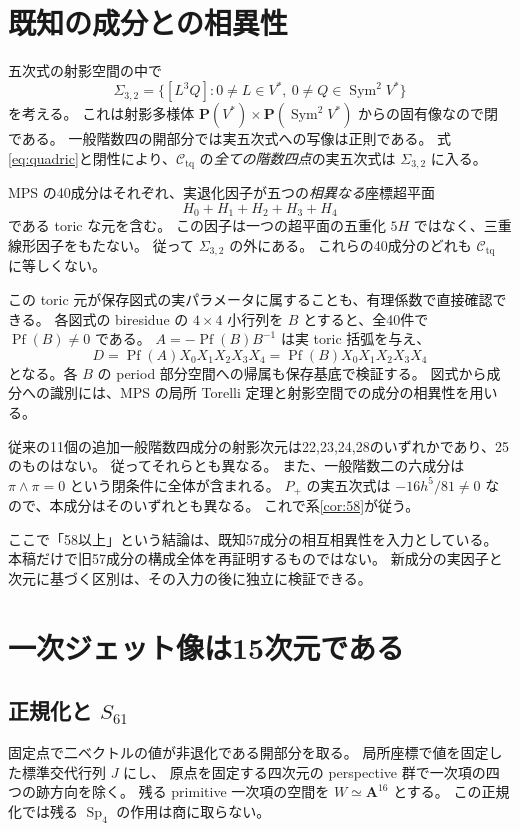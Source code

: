 \documentclass[11pt,a4paper]{ltjsarticle}
\newcommand{\PP}{\mathbf P}
\renewcommand{\AA}{\mathbf A}
\newcommand{\cC}{\mathcal C_{\mathrm{tq}}}
\newcommand{\Sym}{\operatorname{Sym}}
\DeclareMathOperator{\Sp}{Sp}
\theoremstyle{remark}
\begin{document}
\section{既知の成分との相異性}

五次式の射影空間の中で
\[
 \Sigma_{3,2}=\{[L^3Q]:0\ne L\in V^*,\ 0\ne Q\in\Sym^2V^*\}
\]
を考える。
これは射影多様体 $\PP(V^*)\times\PP(\Sym^2V^*)$ からの固有像なので閉である。
一般階数四の開部分では実五次式への写像は正則である。
式\eqref{eq:quadric}と閉性により、$\cC$ の\emph{全ての階数四点}の実五次式は
$\Sigma_{3,2}$ に入る。

MPS の40成分はそれぞれ、実退化因子が五つの\emph{相異なる}座標超平面
\[
 H_0+H_1+H_2+H_3+H_4
\]
である toric な元を含む\cite{mps}。
この因子は一つの超平面の五重化 $5H$ ではなく、三重線形因子をもたない。
従って $\Sigma_{3,2}$ の外にある。
これらの40成分のどれも $\cC$ に等しくない。

この toric 元が保存図式の実パラメータに属することも、有理係数で直接確認できる。
各図式の biresidue の $4\times4$ 小行列を $B$ とすると、全40件で $\operatorname{Pf}(B)\ne0$ である。
$A=-\operatorname{Pf}(B)B^{-1}$ は実 toric 括弧を与え、
\[
 D=\operatorname{Pf}(A)X_0X_1X_2X_3X_4
   =\operatorname{Pf}(B)X_0X_1X_2X_3X_4
\]
となる。各 $B$ の period 部分空間への帰属も保存基底で検証する。
図式から成分への識別には、MPS の局所 Torelli 定理と射影空間での成分の相異性を用いる。

従来の11個の追加一般階数四成分の射影次元は22,23,24,28のいずれかであり、25のものはない。
従ってそれらとも異なる。
また、一般階数二の六成分は $\pi\wedge\pi=0$ という閉条件に全体が含まれる。
$P_+$ の実五次式は $-16h^5/81\ne0$ なので、本成分はそのいずれとも異なる。
これで系\ref{cor:58}が従う。

ここで「58以上」という結論は、既知57成分の相互相異性を入力としている。
本稿だけで旧57成分の構成全体を再証明するものではない。
新成分の実因子と次元に基づく区別は、その入力の後に独立に検証できる。

\section{一次ジェット像は15次元である}

\subsection{正規化と \texorpdfstring{$S_{61}$}{S61}}

固定点で二ベクトルの値が非退化である開部分を取る。
局所座標で値を固定した標準交代行列 $J$ にし、
原点を固定する四次元の perspective 群で一次項の四つの跡方向を除く。
残る primitive 一次項の空間を $W\simeq\AA^{16}$ とする。
この正規化では残る $\Sp_4$ の作用は商に取らない。
\end{document}
